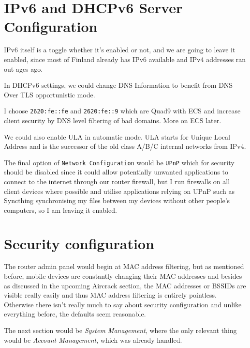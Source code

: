 \documentclass[../wifi-security.tex]{subfiles}
\begin{document}
\section{IPv6 and DHCPv6 Server Configuration}

IPv6 itself is a toggle whether it's enabled or not, and we are going to leave it enabled, since most of Finland already has IPv6 available and IPv4 addresses ran out ages ago.

In DHCPv6 settings, we could change DNS Information to benefit from DNS Over TLS opportunistic mode. %


I choose \texttt{2620:fe::fe} and \texttt{2620:fe::9} which are Quad9 with ECS and increase client security by DNS level filtering of bad domains. More on ECS later. %

We could also enable ULA in automatic mode. ULA starts for Unique Local Address and is the successor of the old class A/B/C internal networks from IPv4.

The final option of \texttt{Network Configuration} would be \texttt{UPnP} which for security should be disabled since it could allow potentially unwanted applications to connect to the internet through our router firewall, but I run firewalls on all client devices where possible and utilise applications relying on UPnP such as Syncthing synchronising my files between my devices without other people's computers, so I am leaving it enabled.

\section{Security configuration}

The router admin panel would begin at MAC address filtering, but as mentioned before, mobile devices are constantly changing their MAC addresses and besides as discussed in the upcoming Aircrack section, the MAC addresses or BSSIDs are visible really easily and thus MAC address filtering is entirely pointless. Otherwise there isn't really much to say about security configuration and unlike everything before, the defaults seem reasonable.

The next section would be \textit{System Management}, where the only relevant thing would be \textit{Account Management}, which was already handled.

\printbibliography[title={Chapter references}]
\end{document}
